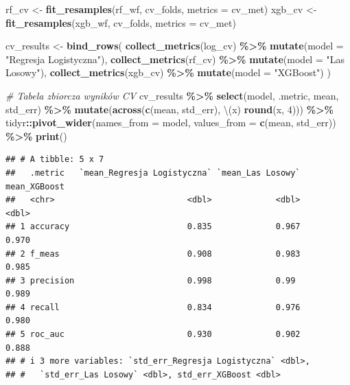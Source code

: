 \documentclass[
]{article}
\newenvironment{Shaded}{\begin{snugshade}}{\end{snugshade}}
\newcommand{\AttributeTok}[1]{\textcolor[rgb]{0.13,0.29,0.53}{#1}}
\newcommand{\CommentTok}[1]{\textcolor[rgb]{0.56,0.35,0.01}{\textit{#1}}}
\newcommand{\DecValTok}[1]{\textcolor[rgb]{0.00,0.00,0.81}{#1}}
\newcommand{\FunctionTok}[1]{\textcolor[rgb]{0.13,0.29,0.53}{\textbf{#1}}}
\newcommand{\NormalTok}[1]{#1}
\newcommand{\OtherTok}[1]{\textcolor[rgb]{0.56,0.35,0.01}{#1}}
\newcommand{\SpecialCharTok}[1]{\textcolor[rgb]{0.81,0.36,0.00}{\textbf{#1}}}
\newcommand{\StringTok}[1]{\textcolor[rgb]{0.31,0.60,0.02}{#1}}
\begin{document}
\begin{Shaded}
\begin{Highlighting}[]
\NormalTok{rf\_cv  }\OtherTok{\textless{}{-}} \FunctionTok{fit\_resamples}\NormalTok{(rf\_wf,  cv\_folds, }\AttributeTok{metrics =}\NormalTok{ cv\_met)}
\NormalTok{xgb\_cv }\OtherTok{\textless{}{-}} \FunctionTok{fit\_resamples}\NormalTok{(xgb\_wf, cv\_folds, }\AttributeTok{metrics =}\NormalTok{ cv\_met)}

\NormalTok{cv\_results }\OtherTok{\textless{}{-}} \FunctionTok{bind\_rows}\NormalTok{(}
  \FunctionTok{collect\_metrics}\NormalTok{(log\_cv) }\SpecialCharTok{\%\textgreater{}\%} \FunctionTok{mutate}\NormalTok{(}\AttributeTok{model =} \StringTok{"Regresja Logistyczna"}\NormalTok{),}
  \FunctionTok{collect\_metrics}\NormalTok{(rf\_cv)  }\SpecialCharTok{\%\textgreater{}\%} \FunctionTok{mutate}\NormalTok{(}\AttributeTok{model =} \StringTok{"Las Losowy"}\NormalTok{),}
  \FunctionTok{collect\_metrics}\NormalTok{(xgb\_cv) }\SpecialCharTok{\%\textgreater{}\%} \FunctionTok{mutate}\NormalTok{(}\AttributeTok{model =} \StringTok{"XGBoost"}\NormalTok{)}
\NormalTok{)}

\CommentTok{\# Tabela zbiorcza wyników CV}
\NormalTok{cv\_results }\SpecialCharTok{\%\textgreater{}\%}
  \FunctionTok{select}\NormalTok{(model, .metric, mean, std\_err) }\SpecialCharTok{\%\textgreater{}\%}
  \FunctionTok{mutate}\NormalTok{(}\FunctionTok{across}\NormalTok{(}\FunctionTok{c}\NormalTok{(mean, std\_err), \textbackslash{}(x) }\FunctionTok{round}\NormalTok{(x, }\DecValTok{4}\NormalTok{))) }\SpecialCharTok{\%\textgreater{}\%}
\NormalTok{  tidyr}\SpecialCharTok{::}\FunctionTok{pivot\_wider}\NormalTok{(}\AttributeTok{names\_from =}\NormalTok{ model, }\AttributeTok{values\_from =} \FunctionTok{c}\NormalTok{(mean, std\_err)) }\SpecialCharTok{\%\textgreater{}\%}
  \FunctionTok{print}\NormalTok{()}
\end{Highlighting}
\end{Shaded}

\begin{verbatim}
## # A tibble: 5 x 7
##   .metric   `mean_Regresja Logistyczna` `mean_Las Losowy` mean_XGBoost
##   <chr>                           <dbl>             <dbl>        <dbl>
## 1 accuracy                        0.835             0.967        0.970
## 2 f_meas                          0.908             0.983        0.985
## 3 precision                       0.998             0.99         0.989
## 4 recall                          0.834             0.976        0.980
## 5 roc_auc                         0.930             0.902        0.888
## # i 3 more variables: `std_err_Regresja Logistyczna` <dbl>,
## #   `std_err_Las Losowy` <dbl>, std_err_XGBoost <dbl>
\end{verbatim}
\end{document}
